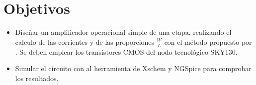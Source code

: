 \section{Objetivos \label{sec:obj}}


\begin{itemize} 
	\item Diseñar un amplificador operacional simple de una etapa, realizando el calculo de las corrientes y de las proporciones $\frac{W}{L}$ con el método propuesto por \cite{Allen_2012}. Se deben emplear los transistores CMOS del nodo tecnológico SKY130.
	\item Simular el circuito con al herramienta de Xschem y NGSpice para comprobar los resultados.	
\end{itemize}